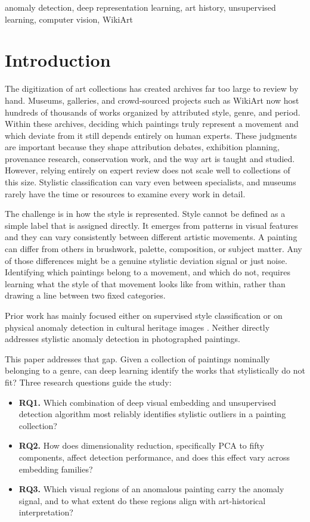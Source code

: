 \documentclass[conference]{IEEEtran}
\begin{document}
\begin{IEEEkeywords}
anomaly detection, deep representation learning, art history, unsupervised learning, computer vision, WikiArt
\end{IEEEkeywords}

\section{Introduction}
\label{sec:introduction}

The digitization of art collections has created archives far too large to review by hand. Museums, galleries, and crowd-sourced projects such as WikiArt now host hundreds of thousands of works organized by attributed style, genre, and period. Within these archives, deciding which paintings truly represent a movement and which deviate from it still depends entirely on human experts. These judgments are important because they shape attribution debates, exhibition planning, provenance research, conservation work, and the way art is taught and studied. However, relying entirely on expert review does not scale well to collections of this size. Stylistic classification can vary even between specialists, and museums rarely have the time or resources to examine every work in detail.

The challenge is in how the style is represented. Style cannot be defined as a simple label that is assigned directly. It emerges from patterns in visual features and they can vary consistently between different artistic movements. A painting can differ from others in brushwork, palette, composition, or subject matter. Any of those differences might be a genuine stylistic deviation signal or just noise. Identifying which paintings belong to a movement, and which do not, requires learning what the style of that movement looks like from within, rather than drawing a line between two fixed categories.

Prior work has mainly focused either on supervised style classification \cite{lecoutre, sandoval, agarwal, karayev} or on physical anomaly detection in cultural heritage images
\cite{mezina, pu, ji}. Neither directly addresses stylistic anomaly
detection in photographed paintings.

This paper addresses that gap. Given a collection of paintings nominally belonging to a genre, can deep learning identify the works that stylistically do not fit? Three research questions guide the study:

\begin{itemize}
\item \textbf{RQ1.} Which combination of deep visual embedding and
unsupervised detection algorithm most reliably identifies stylistic outliers in a painting collection?
\item \textbf{RQ2.} How does dimensionality reduction, specifically
PCA to fifty components, affect detection performance, and does this effect vary across embedding families?
\item \textbf{RQ3.} Which visual regions of an anomalous painting
carry the anomaly signal, and to what extent do these regions align with art-historical interpretation?
\end{itemize}
\end{document}
